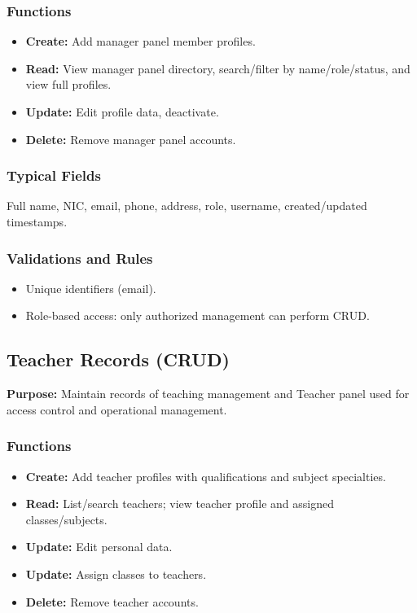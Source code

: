 \documentclass[12pt, a4paper]{report}
\begin{document}
\subsubsection*{Functions}
\begin{itemize}[leftmargin=*]
  \item \textbf{Create:} Add manager panel member profiles.
  \item \textbf{Read:} View manager panel directory, search/filter by name/role/status, and view full profiles.
  \item \textbf{Update:} Edit profile data, deactivate.
  \item \textbf{Delete:} Remove manager panel accounts.
\end{itemize}

\subsubsection*{Typical Fields}
Full name, NIC, email, phone, address, role, username, created/updated timestamps.

\subsubsection*{Validations and Rules}
\begin{itemize}[leftmargin=*]
  \item Unique identifiers (email).
  \item Role-based access: only authorized management can perform CRUD.
\end{itemize}

\subsection{Teacher Records (CRUD)}
\textbf{Purpose:} Maintain records of teaching management and Teacher panel used for access control and operational management.

\subsubsection*{Functions}
\begin{itemize}[leftmargin=*]
  \item \textbf{Create:} Add teacher profiles with qualifications and subject specialties.
  \item \textbf{Read:} List/search teachers; view teacher profile and assigned classes/subjects.
  \item \textbf{Update:} Edit personal data.
  \item \textbf{Update:} Assign classes to teachers.
  \item \textbf{Delete:} Remove teacher accounts.
\end{itemize}
\end{document}
